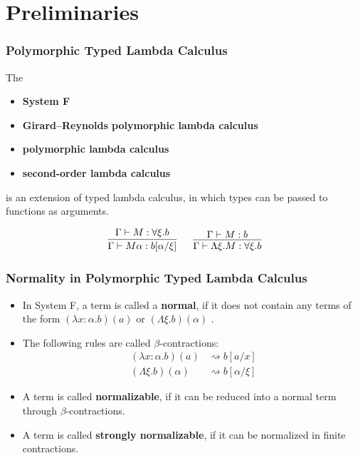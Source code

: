 
\section{Preliminaries}

\begin{frame}[fragile]
    \frametitle{Polymorphic Typed Lambda Calculus}
  
    The
    \begin{itemize}
        \item \textbf{System F}
        \item \textbf{Girard--Reynolds polymorphic lambda calculus}
        \item \textbf{polymorphic lambda calculus}
        \item \textbf{second-order lambda calculus}
    \end{itemize}
    is an extension of typed lambda calculus, in which types can be passed to functions as arguments.
  
    $$
    \begin{matrix}
    \infer{\Gamma \vdash M\alpha : b[\alpha/\xi]}{\Gamma \vdash M : \forall\xi.b}
    \ &\ 
    \infer{\Gamma \vdash \Lambda\xi. M : \forall\xi.b}{\Gamma \vdash M : b}
    \end{matrix}
    $$
\end{frame}

\begin{frame}[fragile]
    \frametitle{Normality in Polymorphic Typed Lambda Calculus}
  
    \begin{itemize}
        \item In System F, a term is called a \textbf{normal}, if it does not contain any terms of the form $(\lambda x: \alpha. b)(a)$ or $(\Lambda \xi. b)(\alpha)$  \cite{capretta_valentini_1999}.
        \item The following rules are called $\beta$-contractions:
        \begin{align*}
            (\lambda x: \alpha. b)(a) &\rightsquigarrow b [a/x] \\
            (\Lambda \xi. b)(\alpha) &\rightsquigarrow b [\alpha / \xi]
        \end{align*}
        \item A term is called \textbf{normalizable}, if it can be reduced into a normal term through $\beta$-contractions.
        \item A term is called \textbf{strongly normalizable}, if it can be normalized in finite contractions.
    \end{itemize}
\end{frame}

